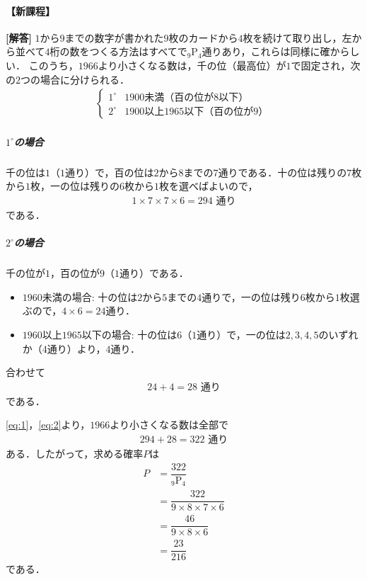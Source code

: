 \documentclass[../../main.tex]{subfiles}
\begin{document}
\begin{oframed}
  
\end{oframed}

\paragraph{【新課程】}
{\bf [解答]}
$1$から$9$までの数字が書かれた$9$枚のカードから$4$枚を続けて取り出し，左から並べて$4$桁の数をつくる方法はすべてで${}_9\mathrm{P}_4$通りあり，これらは同様に確からしい．
このうち，$1966$より小さくなる数は，千の位（最高位）が$1$で固定され，次の$2$つの場合に分けられる．
\begin{align}
  \begin{cases}
    1^\circ & 1900\text{未満（百の位が8以下）} \\
    2^\circ & 1900\text{以上}1965\text{以下（百の位が9）}
  \end{cases}
\end{align}

\subparagraph{$1^\circ$の場合}
千の位は$1$（$1$通り）で，百の位は$2$から$8$までの$7$通りである．十の位は残りの$7$枚から$1$枚，一の位は残りの$6$枚から$1$枚を選べばよいので，
\begin{align}
  1 \times 7 \times 7 \times 6 = 294 \text{ 通り} \label{eq:1}
\end{align}
である．

\subparagraph{$2^\circ$の場合}
千の位が$1$，百の位が$9$（$1$通り）である．
\begin{itemize}
  \item $1960$未満の場合: 十の位は$2$から$5$までの$4$通りで，一の位は残り$6$枚から$1$枚選ぶので，$4 \times 6 = 24$通り．
  \item $1960$以上$1965$以下の場合: 十の位は$6$（$1$通り）で，一の位は$2, 3, 4, 5$のいずれか（$4$通り）より，$4$通り．
\end{itemize}
合わせて
\begin{align}
  24 + 4 = 28 \text{ 通り} \label{eq:2}
\end{align}
である．\casesend

\cref{eq:1}，\cref{eq:2}より，$1966$より小さくなる数は全部で
\begin{align}
  294 + 28 = 322 \text{ 通り}
\end{align}
ある．したがって，求める確率$P$は
\begin{align}
  P &= \dfrac{322}{{}_9\mathrm{P}_4} \nonumber\\
  &= \dfrac{322}{9 \times 8 \times 7 \times 6} \nonumber\\
  &= \dfrac{46}{9 \times 8 \times 6} \nonumber\\
  &= \dfrac{23}{216} \tag{答}
\end{align}
である．
\end{document}
